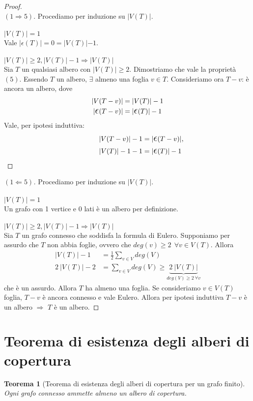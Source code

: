 \documentclass[12pt,twoside]{article}
\newcommand{\implica}{\Longrightarrow}
\renewcommand\qedsymbol{$\blacksquare$}
\newcommand{\Eps}{${\Large$\epsilon$}$}
\newcommand{\baseinduzalbero}[1]{\\\\{\boldmath$ |V(T)| = #1$}}
\newcommand{\induzalbero}[1]{\\\\{\boldmath$|V(T)| \ge #1, |V(T)| -1 \implica |V(T)|$}}
\newtheorem{theorem}{Teorema}
\begin{document}
\renewcommand\qedsymbol{$\square$}
\begin{proof}\ \\
$(1 \implica 5).$ Procediamo per induzione su $|V(T)|$.
\baseinduzalbero{1}
\\Vale $|\Eps(T)| = 0 = |V(T)| - 1$.
\induzalbero{2}\nopagebreak
\\Sia $T$ un qualsiasi albero con $|V(T)| \ge 2$. Dimostriamo che vale la proprietà $(5)$. Essendo $T$ un albero, $\exists$ almeno una foglia $v \in T$. Consideriamo ora $T - v$: è ancora un albero, dove
\begin{align*}
|V(T-v)| &= |V(T)| - 1 \\
| \mathlarger{\mathlarger{\epsilon}} (T-v) | &= |\mathlarger{\mathlarger{\epsilon}} (T) | -1 
\end{align*}
Vale, per ipotesi induttiva:
\begin{align*}
|V(T-v) | -1 &= |\mathlarger{\mathlarger{\epsilon}}(T-v)|,
\\ \qquad\qquad |V(T)| -1 -1 &= |\mathlarger{\mathlarger{\epsilon}}(T) | -1
\end{align*}
\end{proof}

\renewcommand\qedsymbol{$\blacksquare$}
\begin{proof}[$(1 \Longleftarrow 5)$]
Procediamo per induzione su $|V(T)|$.
\baseinduzalbero{1}
\\ Un grafo con 1 vertice e 0 lati è un albero per definizione.
\induzalbero{2}\nopagebreak
\\ Sia $T$ un grafo connesso che soddisfa la formula di Eulero. Supponiamo per assurdo che $T$ non abbia foglie, ovvero che $deg(v) \ge 2 \ \ \forall v \in V(T)$. Allora
\begin{align*}
|V(T)| - 1 &= \frac{1}{2} \sum_{v \in V} deg(V) \\ 
2\ |V(T) | -2 &= \sum_{v \in V} deg(V) \ge \underbrace{2 \ |V(T)|}_{deg(V) \ge 2 \ \forall v}
\end{align*}
che è un assurdo. Allora $T$ ha almeno una foglia. Se consideriamo $v \in V(T)$ foglia, $T-v$ è ancora connesso e vale Eulero. Allora per ipotesi induttiva $T - v$ è un albero $\implica$ $T$ è un albero.
\end{proof}

\section{Teorema di esistenza degli alberi di copertura}
\begin{theorem}[Teorema di esistenza degli alberi di copertura per un grafo finito]
Ogni grafo connesso ammette almeno un albero di copertura.
\end{theorem}
\end{document}
